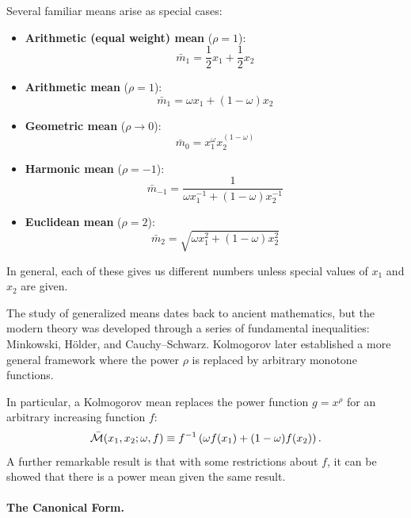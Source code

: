 Several familiar means arise as special cases:
\begin{itemize}[leftmargin=0em]
    \item \textbf{Arithmetic (equal weight) mean} ($\rho = 1$): 
    \[
    \bar{m}_1 = \frac{1}{2} x_1 + \frac{1}{2} x_2
    \]
    \item \textbf{Arithmetic mean} ($\rho = 1$): 
    \[
    \bar{m}_1 = \omega x_1 + (1-\omega) x_2
    \]
    
    \item \textbf{Geometric mean} ($\rho \to 0$): 
    \[
    \bar{m}_0 = x_1^\omega x_2^{(1-\omega)}
    \]
    
    \item \textbf{Harmonic mean} ($\rho = -1$): 
    \[
    \bar{m}_{-1} = \frac{1}{\omega x_1^{-1} + (1-\omega) x_2^{-1}}
    \]
    
    \item \textbf{Euclidean mean} ($\rho = 2$): 
    \[
    \bar{m}_2 = \sqrt{\omega x_1^2 + (1-\omega) x_2^2}
    \]
\end{itemize}

In general, each of these gives us different numbers unless special values of $x_1$ and $x_2$ are given.

\begin{calloutnote}
The study of generalized means dates back to ancient mathematics, but the modern theory was developed through a series of fundamental inequalities: Minkowski, Hölder, and Cauchy--Schwarz. Kolmogorov later established a more general framework where the power $\rho$ is replaced by arbitrary monotone functions.

In particular, a Kolmogorov mean replaces the power function $g=x^\rho$ for an arbitrary increasing function $f$:
\begin{equation}
\label{eq:classical-mean}
\bar{\mathcal{M}}(x_1, x_2; \omega, f) \equiv f^{-1}\left( \omega f(x_1) + (1-\omega) f(x_2) \right).
\end{equation}
A further remarkable result is that with some restrictions about $f$, it can be showed that there is a power mean given the same result. 
\end{calloutnote}

\paragraph{The Canonical Form.}

